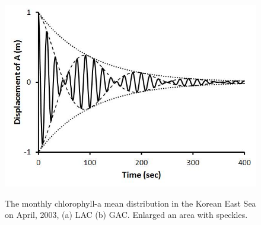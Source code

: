     \begin{figure}[t]
  	\centering
  	\includegraphics[width=0.8\linewidth]{../images/monHISSPEC}\\
  	\caption{The monthly chlorophyll-a mean distribution in the Korean East Sea on April, 2003, (a) LAC (b) GAC. Enlarged an area with speckles.}
  	\label{fig:monHISSPEC}
  \end{figure}
  